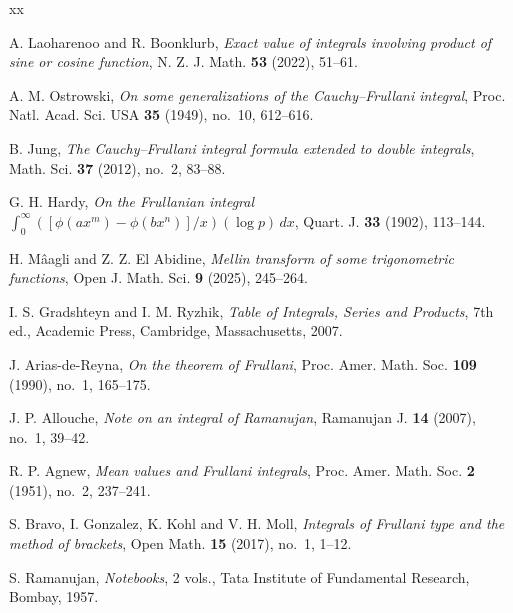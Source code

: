 \documentclass[12pt, reqno]{amsart}
\theoremstyle{plain}
\theoremstyle{definition}
\begin{document}
\begin{thebibliography}{xx}

A. Laoharenoo and R. Boonklurb, \textit{Exact value of integrals involving product of sine or
cosine function}, N. Z. J. Math. \textbf{53} (2022), 51--61.

A. M. Ostrowski, \textit{On some generalizations of the Cauchy--Frullani integral},
Proc. Natl. Acad. Sci. USA \textbf{35} (1949), no.~10, 612--616. 

B. Jung, \textit{The Cauchy--Frullani integral formula extended to double integrals},
Math. Sci. \textbf{37} (2012), no.~2, 83--88. 


G. H. Hardy, {\it On the Frullanian integral $\int_0^{\infty}([\phi(ax^m)-\phi(bx^n)]/x)(\log p)\,dx$},
Quart. J. \textbf{33} (1902), 113--144.


H. Mâagli and Z. Z. El Abidine, \textit{Mellin transform of some trigonometric functions}, Open J. Math. Sci. \textbf{9} (2025), 245--264.

I. S. Gradshteyn and I. M. Ryzhik, {\it Table of Integrals, Series and Products}, 7th ed.,
Academic Press, Cambridge, Massachusetts, 2007.



J. Arias-de-Reyna, {\it On the theorem of Frullani},
Proc. Amer. Math. Soc. \textbf{109} (1990), no.~1, 165--175.


J. P. Allouche, \textit{Note on an integral of Ramanujan},
Ramanujan J. \textbf{14} (2007), no.~1, 39--42. 



R. P. Agnew, \textit{Mean values and Frullani integrals},
Proc. Amer. Math. Soc. \textbf{2} (1951), no.~2, 237--241. 


S. Bravo, I. Gonzalez, K. Kohl and V. H. Moll, \textit{Integrals of Frullani type and the method of brackets},
Open Math. \textbf{15} (2017), no.~1, 1--12. 



S. Ramanujan, \textit{Notebooks}, 2 vols., Tata Institute of Fundamental Research, Bombay, 1957.


\end{thebibliography}
\end{document}
